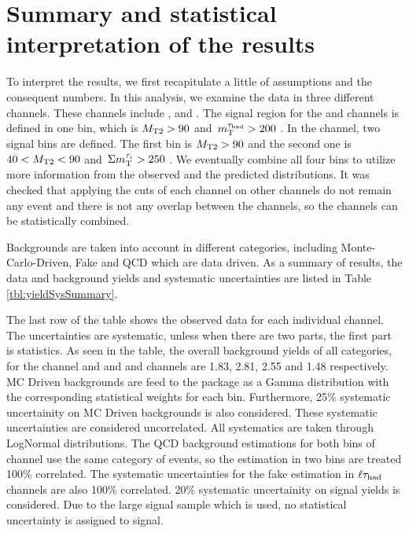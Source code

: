 \section{Summary and statistical interpretation of the results}
\label{sect:stat}
To interpret the results, we first recapitulate a little of assumptions and the consequent numbers.
In this analysis, we examine the data in three different channels.
These channels include \tauTau, \muTau and \eTau.
The signal region for the \muTau and \eTau channels is defined in one bin, which is ${M_{\rm T2}} > 90$ \GeV and $\,m_{\rm T}^{\tau_{\rm had}} > 200$ \GeV.
In the \tauTau channel, two signal bins are defined.
The first bin is ${M_{\rm T2}} > 90$ \GeV and the second one is $40 < {M_{\rm T2}} < 90$ \GeV and $\,\Sigma m_{\rm T}^{\tau_i} > 250$ \GeV.
We eventually combine all four bins to utilize more information from the observed and the predicted distributions.
It was checked that applying the cuts of each channel on other channels do not remain any event and 
there is not any overlap between the channels, so the channels can be statistically combined.


Backgrounds are taken into account in different categories, including Monte-Carlo-Driven, Fake and QCD which are data driven.
As a summary of results, the data and background yields and systematic uncertainties are listed in Table \ref{tbl:yieldSysSummary}. 

The last row of the table shows the observed data for  each individual channel.  The uncertainties are systematic, unless when there are 
two parts, the first part is statistics.
As seen in the table, the overall background yields of all categories, 
for the \tauTau channel \binone and \bintwo and \eTau and \muTau channels are  
1.83, 2.81, 2.55 and 1.48 respectively.
MC Driven backgrounds are feed to the package as a Gamma distribution with the corresponding statistical weights for each bin.
Furthermore, 25\% systematic uncertainity on MC Driven backgrounds is also considered. These systematic uncertainties are considered uncorrelated.
All systematics are taken through LogNormal distributions. 
The QCD background estimations for 
both bins of \tauTau channel use the same category of events, so the estimation in two bins are treated 100\% correlated. 
The systematic uncertainties for the fake estimation in $\ell\tau_{\rm had}$ channels are also 100\% correlated. 
20\% systematic uncertainity on signal yields is considered. 
Due to the large signal sample which is used, no statistical uncertainty is assigned to signal.

